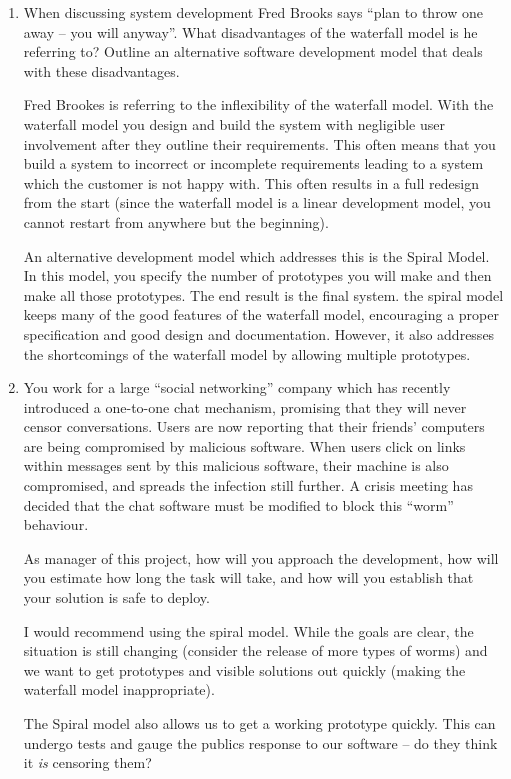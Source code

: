\documentclass[10pt,\jkfside,a4paper]{article}
\begin{document}
\begin{enumerate}
\begin{enumerate}[label=(\alph*)]
\item When discussing system development Fred Brooks says ``plan to throw one away -- you will anyway''.
What disadvantages of the waterfall model is he referring to?
Outline an alternative software development model that deals with these disadvantages.

Fred Brookes is referring to the inflexibility of the waterfall model. With the waterfall model you design and build
the system with negligible user involvement after they outline their requirements. This often means that you build a
system to incorrect or incomplete requirements leading to a system which the customer is not happy with. This often
results in a full redesign from the start (since the waterfall model is a linear development model, you cannot
restart from anywhere but the beginning).

An alternative development model which addresses this is the Spiral Model. In this model, you specify the number of
prototypes you will make and then make all those prototypes. The end result is the final system. the spiral model
keeps many of the good features of the waterfall model, encouraging a proper specification and good design and
documentation. However, it also addresses the shortcomings of the waterfall model by allowing multiple prototypes.

\item You work for a large ``social networking'' company which has recently introduced a one-to-one chat mechanism,
promising that they will never censor conversations.
Users are now reporting that their friends' computers are being compromised by malicious software.
When users click on links within messages sent by this malicious software, their machine is also compromised,
and spreads the infection still further.
A crisis meeting has decided that the chat software must be modified to block this ``worm'' behaviour.

As manager of this project, how will you approach the development, how will you estimate how long the
task will take, and how will you establish that your solution is safe to deploy.

I would recommend using the spiral model. While the goals are clear, the situation is
still changing (consider the release of more types of worms) and we want to get prototypes
and visible solutions out quickly (making the waterfall model inappropriate).

The Spiral model also allows us to get a working prototype quickly. This can undergo tests and
gauge the publics response to our software -- do they think it \textit{is} censoring them?


\end{enumerate}
\end{enumerate}
\end{document}
